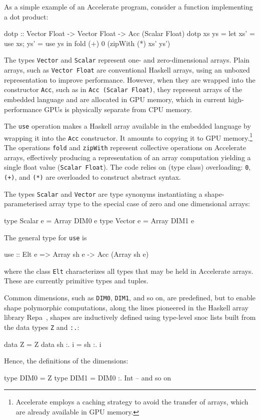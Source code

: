 \documentclass{llncs}
\begin{document}
As a simple example of an Accelerate program, consider a function implementing a dot product:
%
\begin{hcode}
dotp :: Vector Float -> Vector Float -> Acc (Scalar Float)
dotp xs ys = let { xs' = use xs; ys' = use ys }
             in  fold (+) 0 (zipWith (*) xs' ys')
\end{hcode}
%
The types \verb+Vector+ and \verb+Scalar+ represent one- and zero-dimensional
arrays. Plain arrays, such as \verb+Vector Float+ are conventional Haskell arrays, using an unboxed representation to improve performance. However, when they are wrapped into the constructor \verb+Acc+, such as in \verb+Acc (Scalar Float)+, they represent arrays of the embedded language and are allocated in GPU memory, which in current high-performance GPUs is physically separate from CPU memory.

The \verb+use+ operation makes a Haskell array available in the
embedded language by wrapping it into the \verb+Acc+ constructor. It
amounts to copying it to GPU memory.\footnote{Accelerate employs a
  caching strategy to avoid the transfer of arrays, which are already
  available in GPU memory.} The operations \texttt{fold} and
\texttt{zipWith} represent collective operations on Accelerate arrays,
effectively producing a representation of an array computation
yielding  a single float value (\texttt{Scalar Float}). The code relies on (type class) overloading: \texttt{0}, \texttt{(+)}, and
\texttt{(*)} are overloaded to construct abstract syntax. 

The types \verb+Scalar+ and \verb+Vector+ are type synonyms instantiating a shape-parameterised array type to the special case of zero and one dimensional arrays:
%
\begin{hcode}
type Scalar e = Array DIM0 e
type Vector e = Array DIM1 e
\end{hcode}

The general type for \verb+use+ is
%
\begin{hcode}
use :: Elt e => Array sh e -> Acc (Array sh e)
\end{hcode}
%
where the class \verb+Elt+ characterizes all types that may be held in Accelerate arrays. These are currently primitive types and tuples.

Common dimensions, such as \verb+DIM0+, \verb+DIM1+, and so on, are
predefined, but to enable shape polymorphic computations, along the
lines pioneered in the Haskell array library
Repa~\cite{keller-etal:repa}, shapes are inductively defined using
type-level snoc lists built from the data types \texttt{Z} and \texttt{:.}:
%
\begin{hcode}
data Z       = Z
data sh :. i = sh :. i
\end{hcode}
%
Hence, the definitions of the dimensions:
%
\begin{hcode}
type DIM0 = Z
type DIM1 = DIM0 :. Int
-- and so on
\end{hcode}
\end{document}
